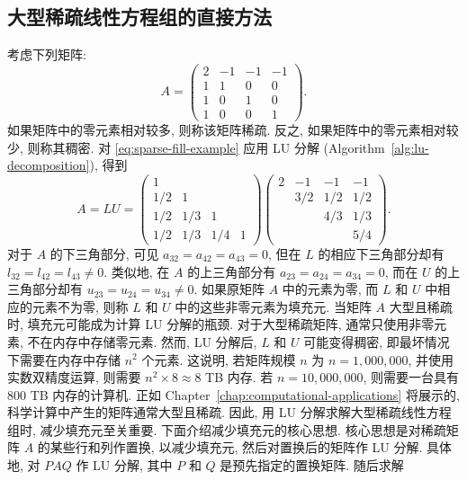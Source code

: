 \subsection{{大型稀疏线性方程组的直接方法}}\label{sec:sparse-direct-methods}
{考虑下列矩阵:}
\begin{equation}\label{eq:sparse-fill-example}
A=\begin{pmatrix}2&-1&-1&-1\\1&1&0&0\\1&0&1&0\\1&0&0&1\end{pmatrix}.
\end{equation}
{如果矩阵中的零元素相对较多, 则称该矩阵稀疏. 反之, 如果矩阵中的零元素相对较少, 则称其稠密.}
{对 \eqref{eq:sparse-fill-example} 应用 LU 分解 (Algorithm~\ref{alg:lu-decomposition}), 得到}
\[
A=LU=
\begin{pmatrix}1&&&\\1/2&1&&\\1/2&1/3&1&\\1/2&1/3&1/4&1\end{pmatrix}
\begin{pmatrix}2&-1&-1&-1\\&3/2&1/2&1/2\\&&4/3&1/3\\&&&5/4\end{pmatrix}.
\]
{对于 $A$ 的下三角部分, 可见 $a_{32}=a_{42}=a_{43}=0$, 但在 $L$ 的相应下三角部分却有 $l_{32}=l_{42}=l_{43}\ne0$. 类似地, 在 $A$ 的上三角部分有 $a_{23}=a_{24}=a_{34}=0$, 而在 $U$ 的上三角部分却有 $u_{23}=u_{24}=u_{34}\ne0$. 如果原矩阵 $A$ 中的元素为零, 而 $L$ 和 $U$ 中相应的元素不为零, 则称 $L$ 和 $U$ 中的这些非零元素为填充元.}
{\leavevmode{}\label{idx:chapter-01-section-05:sparse-storage}当矩阵 $A$ 大型且稀疏时, 填充元可能成为计算 LU 分解的瓶颈. 对于大型稀疏矩阵, 通常只使用非零元素, 不在内存中存储零元素. 然而, LU 分解后, $L$ 和 $U$ 可能变得稠密, 即最坏情况下需要在内存中存储 $n^2$ 个元素. 这说明, 若矩阵规模 $n$ 为 $n=1,000,000$, 并使用实数双精度运算, 则需要 $n^2\times8\approx8$ TB 内存. 若 $n=10,000,000$, 则需要一台具有 800 TB 内存的计算机.}
{正如 Chapter~\ref{chap:computational-applications} 将展示的, 科学计算中产生的矩阵通常大型且稀疏. 因此, 用 LU 分解求解大型稀疏线性方程组时, 减少填充元至关重要. 下面介绍减少填充元的核心思想.}
{核心思想是对稀疏矩阵 $A$ 的某些行和列作置换, 以减少填充元, 然后对置换后的矩阵作 LU 分解. 具体地, 对 $PAQ$ 作 LU 分解, 其中 $P$ 和 $Q$ 是预先指定的置换矩阵. 随后求解}
